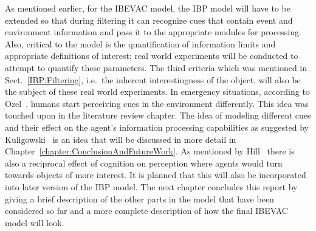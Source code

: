 As mentioned earlier, for the IBEVAC model, the IBP model will have to be extended so that during filtering it can recognize cues that contain event and environment information and pass it to the appropriate modules for processing. Also, critical to the model is the quantification of information limits and appropriate definitions of interest; real world experiments will be conducted to attempt to quantify these parameters. The third criteria which was mentioned in Sect.~\ref{IBP:Filtering}, i.e.\ the inherent interestingness of the object, will also be the subject of these real world experiments. In emergency situations, according to Ozel~\cite{Ozel:2001tn}, humans start perceiving cues in the environment differently. This idea was touched upon in the literature review chapter. The idea of modeling different cues and their effect on the agent's information processing capabilities as suggested by Kuligowski~\cite{Kuligowski:2009un} is an idea that will be discussed in more detail in Chapter~\ref{chapter:ConclusionAndFutureWork}. As mentioned by Hill~\cite{Hill:1999ww} there is also a reciprocal effect of cognition on perception where agents would turn towards objects of more interest. It is planned that this will also be incorporated into later version of the IBP model. The next chapter concludes this report by giving a brief description of the other parts in the model that have been considered so far and a more complete description of how the final IBEVAC model will look. 




